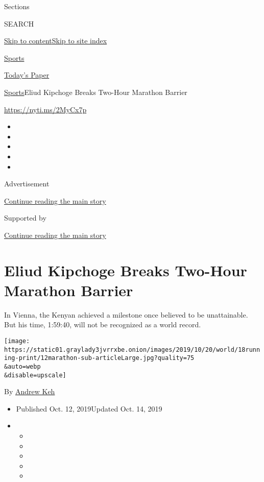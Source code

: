 Sections

SEARCH

\protect\hyperlink{site-content}{Skip to
content}\protect\hyperlink{site-index}{Skip to site index}

\href{https://www.nytimes3xbfgragh.onion/section/sports}{Sports}

\href{https://myaccount.nytimes3xbfgragh.onion/auth/login?response_type=cookie\&client_id=vi}{}

\href{https://www.nytimes3xbfgragh.onion/section/todayspaper}{Today's
Paper}

\href{/section/sports}{Sports}\textbar{}Eliud Kipchoge Breaks Two-Hour
Marathon Barrier

\url{https://nyti.ms/2MyCx7p}

\begin{itemize}
\item
\item
\item
\item
\item
\end{itemize}

Advertisement

\protect\hyperlink{after-top}{Continue reading the main story}

Supported by

\protect\hyperlink{after-sponsor}{Continue reading the main story}

\hypertarget{eliud-kipchoge-breaks-two-hour-marathon-barrier}{%
\section{Eliud Kipchoge Breaks Two-Hour Marathon
Barrier}\label{eliud-kipchoge-breaks-two-hour-marathon-barrier}}

In Vienna, the Kenyan achieved a milestone once believed to be
unattainable. But his time, 1:59:40, will not be recognized as a world
record.

\texttt{[image: https://static01.graylady3jvrrxbe.onion/images/2019/10/20/world/18running-print/12marathon-sub-articleLarge.jpg?quality=75\\\&auto=webp\\\&disable=upscale]}

By \href{https://www.nytimes3xbfgragh.onion/by/andrew-keh}{Andrew Keh}

\begin{itemize}
\item
  Published Oct. 12, 2019Updated Oct. 14, 2019
\item
  \begin{itemize}
  \item
  \item
  \item
  \item
  \item
  \end{itemize}
\end{itemize}


